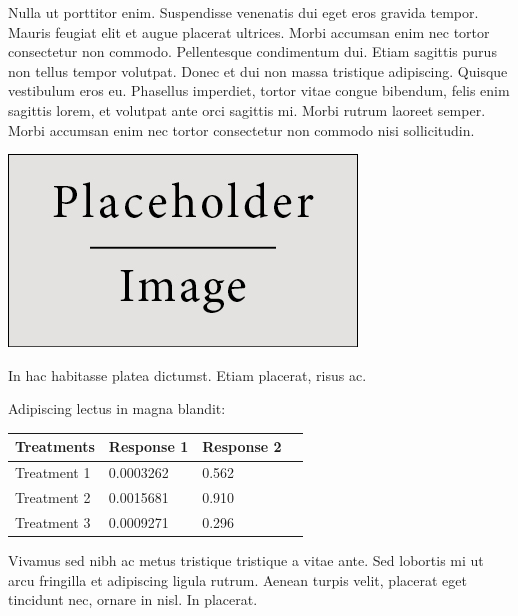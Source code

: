 \documentclass[a0,landscape]{a0poster}
\begin{document}
\begin{multicols}{3}
Nulla ut porttitor enim. Suspendisse venenatis dui eget eros gravida tempor. Mauris feugiat elit et augue placerat ultrices. Morbi accumsan enim nec tortor consectetur non commodo. Pellentesque condimentum dui. Etiam sagittis purus non tellus tempor volutpat. Donec et dui non massa tristique adipiscing. Quisque vestibulum eros eu. Phasellus imperdiet, tortor vitae congue bibendum, felis enim sagittis lorem, et volutpat ante orci sagittis mi. Morbi rutrum laoreet semper. Morbi accumsan enim nec tortor consectetur non commodo nisi sollicitudin.

\begin{center}\vspace{1cm}
\includegraphics[width=0.8\linewidth]{placeholder}
\end{center}\vspace{1cm}

In hac habitasse platea dictumst. Etiam placerat, risus ac.

Adipiscing lectus in magna blandit:

\begin{center}\vspace{1cm}
\begin{tabular}{l l l l}
\toprule
\textbf{Treatments} & \textbf{Response 1} & \textbf{Response 2} \\
\midrule
Treatment 1 & 0.0003262 & 0.562 \\
Treatment 2 & 0.0015681 & 0.910 \\
Treatment 3 & 0.0009271 & 0.296 \\
\bottomrule
\end{tabular}
\end{center}\vspace{1cm}

Vivamus sed nibh ac metus tristique tristique a vitae ante. Sed lobortis mi ut arcu fringilla et adipiscing ligula rutrum. Aenean turpis velit, placerat eget tincidunt nec, ornare in nisl. In placerat.


\end{multicols}
\end{document}
